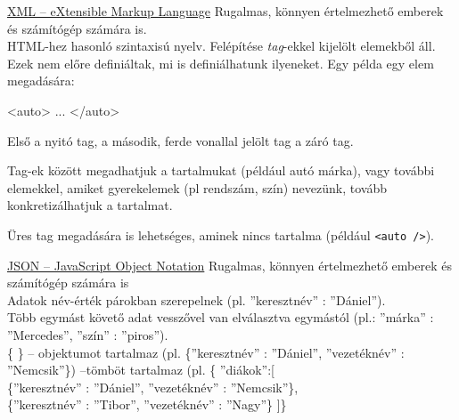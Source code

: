 \bigskip

\noindent \underline{XML – eXtensible Markup Language}
\vspace{10pt}
\newline \noindent Rugalmas, könnyen értelmezhető emberek és számítógép számára is.  
\vspace{5pt}\\HTML-hez hasonló szintaxisú nyelv. Felépítése \textit{tag}-ekkel kijelölt elemekből áll. Ezek nem előre definiáltak, mi is definiálhatunk ilyeneket. Egy példa egy elem megadására:
\begin{java}
<auto> ... </auto>
\end{java}
Első a nyitó tag, a második, ferde vonallal jelölt tag a záró tag.

Tag-ek között megadhatjuk a tartalmukat (például autó márka), vagy további elemekkel, amiket gyerekelemek (pl rendszám, szín) nevezünk, tovább konkretizálhatjuk a tartalmat.

Üres tag megadására is lehetséges, aminek nincs tartalma (például \texttt{<auto />}).


\bigskip

\noindent \underline{JSON – JavaScript Object Notation}
\vspace{10pt}
\newline \noindent Rugalmas, könnyen értelmezhető emberek és számítógép számára is
\vspace{5pt}\\ Adatok név-érték párokban szerepelnek (pl. ”keresztnév” : ”Dániel”).
\\Több egymást követő adat vesszővel van elválasztva egymástól (pl.: ”márka” : ”Mercedes”, ”szín” : ”piros”).
\\ \{ \} – objektumot tartalmaz (pl. \{”keresztnév” : ”Dániel”, ”vezetéknév” : ”Nemcsik”\})
\newline [ ] –tömböt tartalmaz (pl. \{ ”diákok”:[
\\  \indent	\{”keresztnév” : ”Dániel”, ”vezetéknév” : ”Nemcsik”\},
\\  \indent \{”keresztnév” : ”Tibor”, ”vezetéknév” : ”Nagy”\}
]\}


